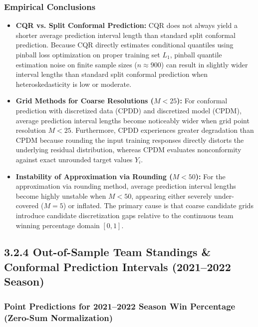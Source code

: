 \documentclass[11pt,a4paper]{article}
\begin{document}
\subsubsection{Empirical Conclusions}
\begin{itemize}
    \item \textbf{CQR vs. Split Conformal Prediction:} CQR does not always yield a shorter average prediction interval length than standard split conformal prediction. Because CQR directly estimates conditional quantiles using pinball loss optimization on proper training set $L_1$, pinball quantile estimation noise on finite sample sizes ($n \approx 900$) can result in slightly wider interval lengths than standard split conformal prediction when heteroskedasticity is low or moderate.
    \item \textbf{Grid Methods for Coarse Resolutions ($M < 25$):} For conformal prediction with discretized data (CPDD) and discretized model (CPDM), average prediction interval lengths become noticeably wider when grid point resolution $M < 25$. Furthermore, CPDD experiences greater degradation than CPDM because rounding the input training responses directly distorts the underlying residual distribution, whereas CPDM evaluates nonconformity against exact unrounded target values $Y_i$.
    \item \textbf{Instability of Approximation via Rounding ($M < 50$):} For the approximation via rounding method, average prediction interval lengths become highly unstable when $M < 50$, appearing either severely under-covered ($M=5$) or inflated. The primary cause is that coarse candidate grids introduce candidate discretization gaps relative to the continuous team winning percentage domain $[0, 1]$.
\end{itemize}

\subsection{3.2.4 Out-of-Sample Team Standings \& Conformal Prediction Intervals (2021--2022 Season)}

\subsubsection{Point Predictions for 2021--2022 Season Win Percentage (Zero-Sum Normalization)}
\end{document}
